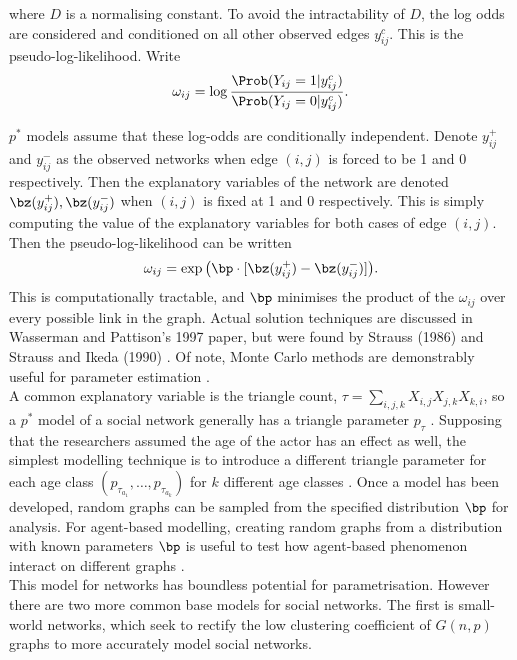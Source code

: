  where $D$ is a normalising constant. To avoid the intractability of $D$, the log odds are considered and conditioned on all other observed edges $y_{ij}^c$. This is the pseudo-log-likelihood. Write 
 $$\omega_{ij} = \log{\frac{\Prob (Y_{ij} =1 | y_{ij}^c)}{\Prob (Y_{ij} =0 | y_{ij}^c)}}.$$ 
 
$p^*$ models assume that these log-odds are conditionally independent. Denote $y_{ij}^+$ and $y_{ij}^-$ as the observed networks when edge $(i,j)$ is forced to be 1 and 0 respectively. Then the explanatory variables of the network are denoted $\bz(y_{ij}^+), \bz(y_{ij}^-) $ when $(i,j)$ is fixed at 1 and 0 respectively. This is simply computing the value of the explanatory variables for both cases of edge $(i,j)$. Then the pseudo-log-likelihood can be written $$
 \omega_{ij} = \exp \big (\bp \cdot [\bz(y_{ij}^+) - \bz(y_{ij}^-)] \big).$$
This is computationally tractable, and $\bp$ minimises the product of the $\omega_{ij}$ over every possible link in the graph. Actual solution techniques are discussed in Wasserman and Pattison's 1997 paper, but were found by Strauss (1986) and Strauss and Ikeda (1990) \cite{RN83}. Of note, Monte Carlo methods are demonstrably useful for parameter estimation \cite{RN86}. \\

A common explanatory variable is the triangle count, $\tau = \sum_{i,j,k} X_{i,j}X_{j,k}X_{k,i}$, so a $p^*$ model of a social network generally has a triangle parameter $p_\tau$ \cite{RN84}. Supposing that the researchers assumed the age of the actor has an effect as well, the simplest modelling technique is to introduce a different triangle parameter for each age class $(p_{\tau_{a_1}}, \dots, p_{\tau_{a_k}})$ for $k$ different age classes \cite{RN64}. Once a model has been developed, random graphs can be sampled from the specified distribution $\bp$ for analysis. For agent-based modelling, creating random graphs from a distribution with known parameters $\bp$ is useful to test how agent-based phenomenon interact on different graphs \cite{RN86}. \\

This model for networks has boundless potential for parametrisation. However there are two more common base models for social networks. The first is small-world networks, which seek to rectify the low clustering coefficient of $G(n,p)$ graphs to more accurately model social networks. \\
 
